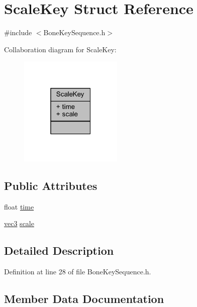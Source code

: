 \hypertarget{struct_scale_key}{}\section{Scale\+Key Struct Reference}
\label{struct_scale_key}


{\ttfamily \#include $<$Bone\+Key\+Sequence.\+h$>$}



Collaboration diagram for Scale\+Key\+:\nopagebreak
\begin{figure}[H]
\begin{center}
\leavevmode
\includegraphics[width=139pt]{struct_scale_key__coll__graph}
\end{center}
\end{figure}
\subsection*{Public Attributes}
\begin{DoxyCompactItemize}
\item 
float \hyperlink{struct_scale_key_a5fc8b5f2ab58d62addddbb51a794fee7}{time}
\item 
\hyperlink{_types_8h_a3d0ce73e3199de81565fb01632415288}{vec3} \hyperlink{struct_scale_key_a49c1e61733ade0134fb94a62620d2caf}{scale}
\end{DoxyCompactItemize}


\subsection{Detailed Description}


Definition at line 28 of file Bone\+Key\+Sequence.\+h.



\subsection{Member Data Documentation}
